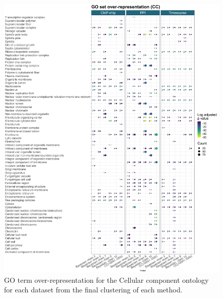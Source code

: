 \documentclass[]{article}
\begin{document}
\begin{figure}
	\centering
	\includegraphics[scale=0.365]{./Images/Yeast/goEnrichmentCompCCvertical.png}
	\caption{GO term over-representation for the Cellular component ontology for each dataset from the final clustering of each method.}
	\label{fig:yeastGOCC}
\end{figure}

%
%
\end{document}

